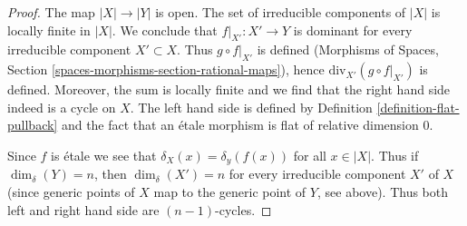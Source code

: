 \documentclass[10pt,a4paper]{amsart}
\theoremstyle{plain}
\theoremstyle{definition}
\theoremstyle{remark}
\numberwithin{equation}{subsection}
\begin{document}
\begin{proof}
The map $|X| \to |Y|$ is open. The set of irreducible components of $|X|$
is locally finite in $|X|$. We conclude that $f|_{X'} : X' \to Y$
is dominant for every irreducible component $X' \subset X$.
Thus $g \circ f|_{X'}$ is defined (Morphisms of Spaces, Section
\ref{spaces-morphisms-section-rational-maps}), hence
$\text{div}_{X'}(g \circ f|_{X'})$ is defined. Moreover, the
sum is locally finite and we find that the right hand side indeed
is a cycle on $X$. The left hand side is defined by
Definition \ref{definition-flat-pullback}
and the fact that an \'etale morphism is flat of relative dimension $0$.

\medskip\noindent
Since $f$ is \'etale we see that $\delta_X(x) = \delta_y(f(x))$
for all $x \in |X|$. Thus if $\dim_\delta(Y) = n$, then $\dim_\delta(X') = n$
for every irreducible component $X'$ of $X$ (since generic points of $X$
map to the generic point of $Y$, see above). Thus both left
and right hand side are $(n - 1)$-cycles.


\end{proof}
\end{document}

